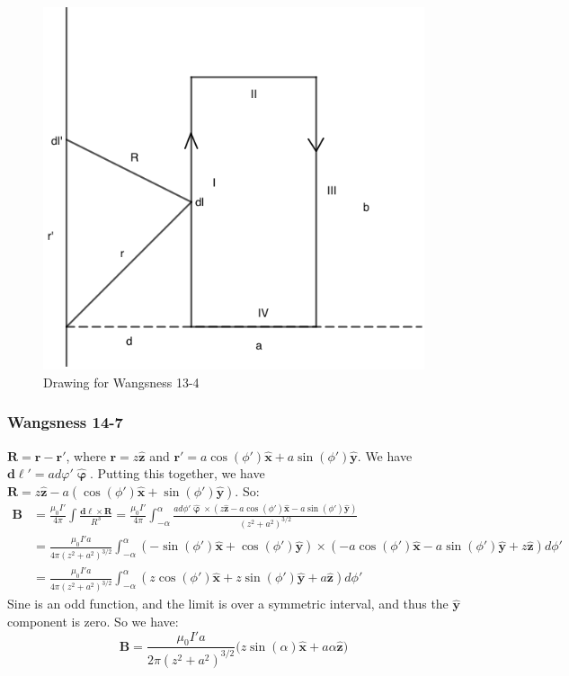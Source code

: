 \documentclass[crop=false,class=book,oneside]{standalone}
\begin{document}
            \begin{figure}[htbp]
                \centering
                \captionsetup{type=figure}
                \includegraphics[scale=0.4]{13-4.png}
                \caption{Drawing for Wangsness 13-4}
            \end{figure}
            \subsubsection{Wangsness 14-7}
            $\mathbf{R} = \mathbf{r}-\mathbf{r}'$, where $\mathbf{r} = z\hat{\mathbf{z}}$ and $\mathbf{r}' = a\cos(\phi')\hat{\mathbf{x}}+a\sin(\phi')\hat{\mathbf{y}}$. We have $\boldsymbol{d\ell}' = ad\varphi' \hat{\boldsymbol{\upvarphi}}$. Putting this together, we have $\mathbf{R} = z\hat{\mathbf{z}} - a(\cos(\phi')\hat{\mathbf{x}}+\sin(\phi')\hat{\mathbf{y}})$. So:
            \begin{align*}
                \mathbf{B} &= \frac{\mu_0 I'}{4\pi}\int \frac{\boldsymbol{d\ell}\times \mathbf{R}}{R^3} = \frac{\mu_0I'}{4\pi} \int_{-\alpha}^{\alpha} \frac{ad\phi' \hat{\boldsymbol{\upvarphi}}\times (z\hat{\mathbf{z}}-a\cos(\phi')\hat{\mathbf{x}}-a\sin(\phi')\hat{\mathbf{y}})}{(z^2+a^2)^{3/2}}\\
                &= \frac{\mu_0 I'a}{4\pi(z^2+a^2)^{3/2}}\int_{-\alpha}^{\alpha} (-\sin(\phi')\hat{\mathbf{x}}+\cos(\phi')\hat{\mathbf{y}})\times (-a\cos(\phi')\hat{\mathbf{x}}-a\sin(\phi')\hat{\mathbf{y}}+z\hat{\mathbf{z}})d\phi'\\
                &= \frac{\mu_0 I'a}{4\pi (z^2+a^2)^{3/2}}\int_{-\alpha}^{\alpha} (z\cos(\phi')\hat{\mathbf{x}}+z\sin(\phi')\hat{\mathbf{y}}+a\hat{\mathbf{z}})d\phi'
            \end{align*}
            Sine is an odd function, and the limit is over a symmetric interval, and thus the $\hat{\mathbf{y}}$ component is zero. So we have:
            \begin{equation*}
                \mathbf{B} = \frac{\mu_0 I' a}{2\pi (z^2+a^2)^{3/2}}\big(z\sin(\alpha)\hat{\mathbf{x}}+a\alpha \hat{\mathbf{z}}\big)    
            \end{equation*}
\end{document}

